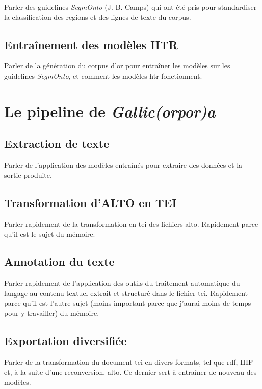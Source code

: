 \documentclass[a4paper,12pt,twoside]{book}
\begin{document}
	Parler des guidelines \textit{SegmOnto} (J.-B. Camps) qui ont été pris pour standardiser la classification des regions et des lignes de texte du corpus.
	
	\section{Entraînement des modèles HTR}
	
	Parler de la génération du corpus d'or pour entraîner les modèles sur les guidelines \textit{SegmOnto}, et comment les modèles \acrshort{htr} fonctionnent.
	
	\chapter{Le pipeline de \textit{Gallic(orpor)a}}
	
	\section{Extraction de texte}
	
	Parler de l'application des modèles entraînés pour extraire des données et la sortie produite.
	
	\section{Transformation d'ALTO en TEI}
	
	Parler rapidement de la transformation en \acrshort{tei} des fichiers \acrshort{alto}. Rapidement parce qu'il est le sujet du mémoire.
	
	\section{Annotation du texte}
	
	Parler rapidement de l'application des outils du traitement automatique du langage au contenu textuel extrait et structuré dans le fichier \acrshort{tei}. Rapidement parce qu'il est l'autre sujet (moins important parce que j'aurai moins de temps pour y travailler) du mémoire.
	
	\section{Exportation diversifiée}
	
	Parler de la transformation du document \acrshort{tei} en divers formats, tel que \acrshort{rdf}, IIIF et, à la suite d'une reconversion, \acrshort{alto}. Ce dernier sert à entraîner de nouveau des modèles.
	
\end{document}
